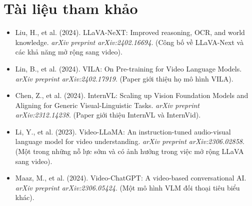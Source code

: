 \section*{Tài liệu tham khảo}
\begin{itemize}
	\item[1] Liu, H., et al. (2024). LLaVA-NeXT: Improved reasoning, OCR, and world knowledge. \textit{arXiv preprint arXiv:2402.16694}. (Công bố về LLaVA-Next và các khả năng mở rộng sang video).
	\item[2] Lin, B., et al. (2024). VILA: On Pre-training for Video Language Models. \textit{arXiv preprint arXiv:2402.17919}. (Paper giới thiệu họ mô hình VILA).
	\item[3] Chen, Z., et al. (2024). InternVL: Scaling up Vision Foundation Models and Aligning for Generic Visual-Linguistic Tasks. \textit{arXiv preprint arXiv:2312.14238}. (Paper giới thiệu InternVL và InternVid).
	\item[4] Li, Y., et al. (2023). Video-LLaMA: An instruction-tuned audio-visual language model for video understanding. \textit{arXiv preprint arXiv:2306.02858}. (Một trong những nỗ lực sớm và có ảnh hưởng trong việc mở rộng LLaVA sang video).
	\item[5] Maaz, M., et al. (2024). Video-ChatGPT: A video-based conversational AI. \textit{arXiv preprint arXiv:2306.05424}. (Một mô hình VLM đối thoại tiêu biểu khác).
\end{itemize}